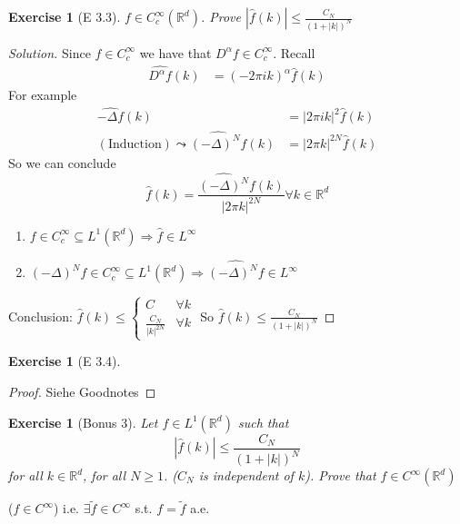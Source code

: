 \documentclass{report}
\theoremstyle{tommy}
\newtheorem{ex}[defn]{Exercise}
\begin{document}
  
  \begin{ex}[E 3.3]
    \(f \in C_c^\infty(\mathbb{R}^d)\). Prove \(|\hat f(k)| \le \frac{C_N}{(1 + |k|)^N}\)
  \end{ex}

  \begin{proof}[Solution]
    Since \(f \in C_c^\infty\) we have that \(D^\alpha f \in C_c^\infty\).
    Recall
    \begin{align*}
      \widehat{D^\alpha f}(k) &= (-2 \pi ik)^\alpha \hat f (k)
    \end{align*}
    For example
    \begin{align*}
      \widehat{- \Delta f}(k) &= |2 \pi i k|^2 \hat f (k) \\
      (\text{Induction}) \leadsto \widehat{(-\Delta)^N f}(k) &= |2 \pi k|^{2N} \hat f (k)
    \end{align*}
    So we can conclude
    \[ \hat f(k) = \frac{\widehat{(-\Delta)^N}f(k)}{|2 \pi k|^{2N}} \forall k \in \mathbb{R}^d\]
    \begin{enumerate}
      \item \(f \in C_c^\infty \subseteq L^1(\mathbb{R}^d) \Rightarrow \hat f \in L^\infty\)
      \item \((-\Delta)^N f \in C_c^\infty \subseteq L^1(\mathbb{R}^d) \Rightarrow \widehat{(-\Delta)^N f} \in L^\infty\)
    \end{enumerate}
    Conclusion: \(\hat f(k) \le \begin{cases}
      C &\forall k \\ \frac{C_N}{|k|^{2N}} &\forall k
    \end{cases}\)
    So \(\hat f(k) \le \frac{C_N}{(1+|k|)^N}\)
  \end{proof}

  \begin{ex}[E 3.4]
    
  \end{ex}

  \begin{proof}
    Siehe Goodnotes
  \end{proof}
  
  \begin{ex}[Bonus 3]
    Let \(f \in L^1(\mathbb{R}^d)\) such that
    \[|\hat f(k)| \le \frac{C_N}{(1 + |k|)^N}\]
    for all \(k \in \mathbb{R}^d\), for all \(N \ge 1\). (\(C_N\) is independent of \(k\)). Prove that \(f \in C^\infty(\mathbb{R}^d)\)
  \end{ex}
  (\(f \in C^\infty\)) i.e. \(\exists \tilde f \in C^\infty\) s.t. \(f = \tilde f\) a.e.
\end{document}
